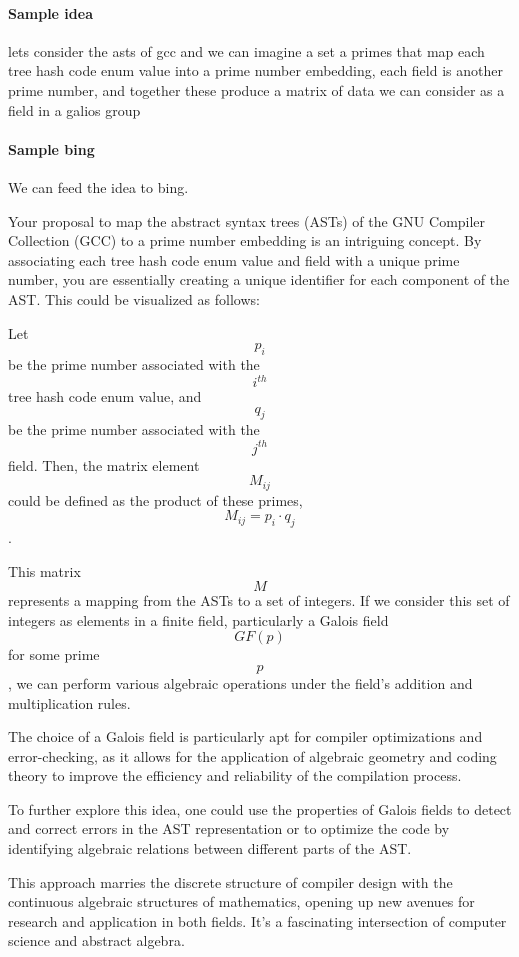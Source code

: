 \documentclass{article}
\begin{document}
\paragraph{Sample idea}

lets consider the asts of gcc and we can imagine a set a primes that map each tree hash code enum value into a prime number embedding, each field is another prime number, and together these produce a matrix of data we can consider as a field in a galios group

\paragraph{Sample bing}

We can feed the idea to bing.

Your proposal to map the abstract syntax trees (ASTs) of the GNU Compiler Collection (GCC) to a prime number embedding is an intriguing concept. By associating each tree hash code enum value and field with a unique prime number, you are essentially creating a unique identifier for each component of the AST. This could be visualized as follows:

Let $$ p_i $$ be the prime number associated with the $$ i^{th} $$ tree hash code enum value, and $$ q_j $$ be the prime number associated with the $$ j^{th} $$ field. Then, the matrix element $$ M_{ij} $$ could be defined as the product of these primes, $$ M_{ij} = p_i \cdot q_j $$.

This matrix $$ M $$ represents a mapping from the ASTs to a set of integers. If we consider this set of integers as elements in a finite field, particularly a Galois field $$ GF(p) $$ for some prime $$ p $$, we can perform various algebraic operations under the field's addition and multiplication rules.

The choice of a Galois field is particularly apt for compiler optimizations and error-checking, as it allows for the application of algebraic geometry and coding theory to improve the efficiency and reliability of the compilation process.

To further explore this idea, one could use the properties of Galois fields to detect and correct errors in the AST representation or to optimize the code by identifying algebraic relations between different parts of the AST.

This approach marries the discrete structure of compiler design with the continuous algebraic structures of mathematics, opening up new avenues for research and application in both fields. It's a fascinating intersection of computer science and abstract algebra.
\end{document}
